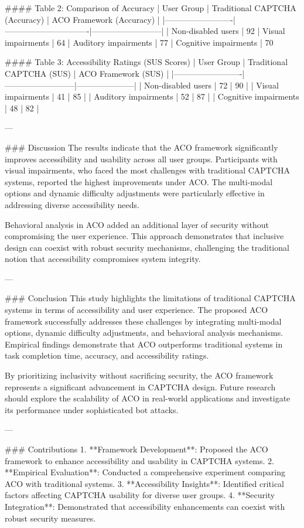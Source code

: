 #### Table 2: Comparison of Accuracy
| User Group              | Traditional CAPTCHA (Accuracy) | ACO Framework (Accuracy) |
|-------------------------|-------------------------------|--------------------------|
| Non-disabled users      | 92%
| Visual impairments      | 64%
| Auditory impairments    | 77%
| Cognitive impairments   | 70%

#### Table 3: Accessibility Ratings (SUS Scores)
| User Group              | Traditional CAPTCHA (SUS) | ACO Framework (SUS) |
|-------------------------|--------------------------|---------------------|
| Non-disabled users      | 72                      | 90                  |
| Visual impairments      | 41                      | 85                  |
| Auditory impairments    | 52                      | 87                  |
| Cognitive impairments   | 48                      | 82                  |

---

### Discussion
The results indicate that the ACO framework significantly improves accessibility and usability across all user groups. Participants with visual impairments, who faced the most challenges with traditional CAPTCHA systems, reported the highest improvements under ACO. The multi-modal options and dynamic difficulty adjustments were particularly effective in addressing diverse accessibility needs.

Behavioral analysis in ACO added an additional layer of security without compromising the user experience. This approach demonstrates that inclusive design can coexist with robust security mechanisms, challenging the traditional notion that accessibility compromises system integrity.

---

### Conclusion
This study highlights the limitations of traditional CAPTCHA systems in terms of accessibility and user experience. The proposed ACO framework successfully addresses these challenges by integrating multi-modal options, dynamic difficulty adjustments, and behavioral analysis mechanisms. Empirical findings demonstrate that ACO outperforms traditional systems in task completion time, accuracy, and accessibility ratings.

By prioritizing inclusivity without sacrificing security, the ACO framework represents a significant advancement in CAPTCHA design. Future research should explore the scalability of ACO in real-world applications and investigate its performance under sophisticated bot attacks.

---

### Contributions
1. **Framework Development**: Proposed the ACO framework to enhance accessibility and usability in CAPTCHA systems.
2. **Empirical Evaluation**: Conducted a comprehensive experiment comparing ACO with traditional systems.
3. **Accessibility Insights**: Identified critical factors affecting CAPTCHA usability for diverse user groups.
4. **Security Integration**: Demonstrated that accessibility enhancements can coexist with robust security measures.

